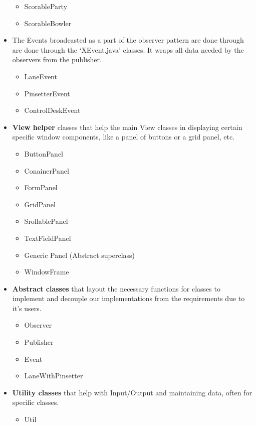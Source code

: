 \begin{itemize}
\begin{itemize}
            \item ScorableParty
            \item ScorableBowler
          \end{itemize}
    \item The Events broadcasted as a part of the observer pattern are done through are done through the `XEvent.java' classes. It wraps all data needed by the observers from the publisher.
          \begin{itemize}
              \item LaneEvent
              \item PinsetterEvent
              \item ControlDeskEvent
          \end{itemize}
    \item \textbf{View helper} classes that help the main View classes in displaying certain specific window components, like a panel of buttons or a grid panel, etc.
          \begin{itemize}
              \item ButtonPanel
              \item ConainerPanel
              \item FormPanel
              \item GridPanel
              \item SrollablePanel
              \item TextFieldPanel
              \item Generic Panel (Abstract superclass)
              \item WindowFrame
          \end{itemize}
    \item \textbf{Abstract classes} that layout the necessary functions for classes to implement and decouple our implementations from the requirements due to it's users.
          \begin{itemize}
              \item Observer
              \item Publisher
              \item Event
              \item LaneWithPinsetter
          \end{itemize}
    \item \textbf{Utility classes} that help with Input/Output and maintaining data, often for specific classes.
          \begin{itemize}
              \item Util

\end{itemize}
\end{itemize}
